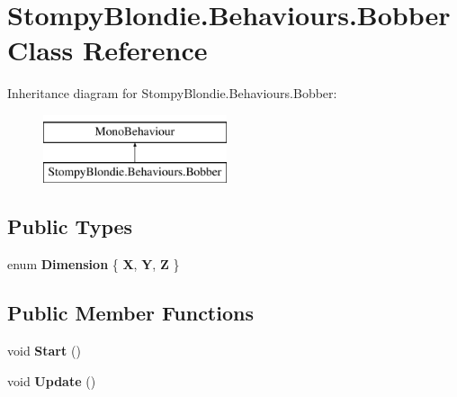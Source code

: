 \hypertarget{class_stompy_blondie_1_1_behaviours_1_1_bobber}{}\section{Stompy\+Blondie.\+Behaviours.\+Bobber Class Reference}
\label{class_stompy_blondie_1_1_behaviours_1_1_bobber}
Inheritance diagram for Stompy\+Blondie.\+Behaviours.\+Bobber\+:\begin{figure}[H]
\begin{center}
\leavevmode
\includegraphics[height=2.000000cm]{class_stompy_blondie_1_1_behaviours_1_1_bobber}
\end{center}
\end{figure}
\subsection*{Public Types}
\begin{DoxyCompactItemize}
\item 
\mbox{\label{class_stompy_blondie_1_1_behaviours_1_1_bobber_aa5824e905d1992e924d9755659a7717e}} 
enum {\bfseries Dimension} \{ {\bfseries X}, 
{\bfseries Y}, 
{\bfseries Z}
 \}
\end{DoxyCompactItemize}
\subsection*{Public Member Functions}
\begin{DoxyCompactItemize}
\item 
\mbox{\label{class_stompy_blondie_1_1_behaviours_1_1_bobber_aaa2f97e7e7532fc665a6284dd275ba71}} 
void {\bfseries Start} ()
\item 
\mbox{\label{class_stompy_blondie_1_1_behaviours_1_1_bobber_a561d9d22d20aaa4091ed153b866d029c}} 
void {\bfseries Update} ()
\end{DoxyCompactItemize}
